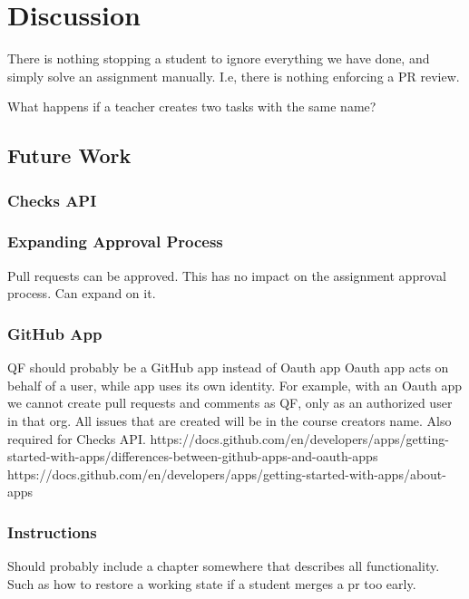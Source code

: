 
\chapter{Discussion}
\label{ch:discussion}

There is nothing stopping a student to ignore everything we have done, and simply solve an assignment manually.
I.e, there is nothing enforcing a PR review.

What happens if a teacher creates two tasks with the same name?

\section{Future Work}

\subsection{Checks API}

\subsection{Expanding Approval Process}
Pull requests can be approved. This has no impact on the assignment approval process. Can expand on it.

\subsection{GitHub App}
\label{section:github-app}

QF should probably be a GitHub app instead of Oauth app
Oauth app acts on behalf of a user, while app uses its own identity.
For example, with an Oauth app we cannot create pull requests and comments as QF, only as an authorized user in that org.
All issues that are created will be in the course creators name.
Also required for Checks API.
https://docs.github.com/en/developers/apps/getting-started-with-apps/differences-between-github-apps-and-oauth-apps
https://docs.github.com/en/developers/apps/getting-started-with-apps/about-apps

\subsection{Instructions}

Should probably include a chapter somewhere that describes all functionality.
Such as how to restore a working state if a student merges a pr too early.